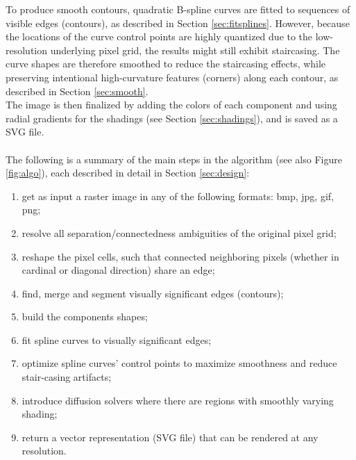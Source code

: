 \documentclass[]{usiinfbachelorproject}
\begin{document}
To produce smooth contours, quadratic B-spline curves are fitted to sequences of visible edges (contours), as described in Section \ref{sec:fitsplines}. However, because the locations of the curve control points are highly quantized due to the low-resolution underlying pixel grid, the results might still exhibit staircasing. The curve shapes are therefore smoothed to reduce the staircasing effects, while preserving intentional high-curvature features (corners) along each contour, as described in Section \ref{sec:smooth}.\\
The image is then finalized by adding the colors of each component and using radial gradients for the shadings (see Section \ref{sec:shadings}), and is saved as a SVG file.\\\\
The following is a summary of the main steps in the algorithm (see also Figure \ref{fig:algo}), each described in detail in Section \ref{sec:design}:
\begin{enumerate}
	\item get as input a raster image in any of the following formats: bmp, jpg, gif, png;
	\item resolve all separation/connectedness ambiguities of the original pixel grid;
	\item reshape the pixel cells, such that connected neighboring pixels (whether in cardinal or diagonal direction) share an edge;
	\item find, merge and segment visually significant edges (contours); 
	\item build the components shapes;
	\item fit spline curves to visually significant edges;
	\item optimize spline curves' control points to maximize smoothness and reduce stair-casing artifacts;
	\item introduce diffusion solvers where there are regions with smoothly varying shading;
	\item return a vector representation (SVG file) that can be rendered at any resolution.
\end{enumerate}
\end{document}
